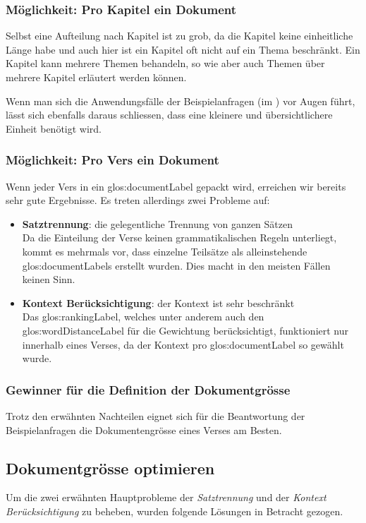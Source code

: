 \subsubsection{Möglichkeit: Pro Kapitel ein Dokument}
Selbst eine Aufteilung nach Kapitel ist zu grob, da die Kapitel keine einheitliche Länge habe und auch hier ist ein Kapitel oft nicht auf ein Thema beschränkt.
Ein Kapitel kann mehrere Themen behandeln, so wie aber auch Themen über mehrere Kapitel erläutert werden können.

Wenn man sich die Anwendungsfälle der Beispielanfragen (im ) vor Augen führt, lässt sich ebenfalls daraus schliessen, dass eine kleinere und übersichtlichere Einheit benötigt wird.

\subsubsection{Möglichkeit: Pro Vers ein Dokument}
Wenn jeder Vers in ein \gls{glos:documentLabel} gepackt wird, erreichen wir bereits sehr gute Ergebnisse.
Es treten allerdings zwei Probleme auf:
\begin{itemize}
	\item \textbf{Satztrennung}: die gelegentliche Trennung von ganzen Sätzen\\
	Da die Einteilung der Verse keinen grammatikalischen Regeln unterliegt, kommt es mehrmals vor, dass einzelne Teilsätze als alleinstehende \glspl{glos:documentLabel} erstellt wurden. Dies macht in den meisten Fällen keinen Sinn.
	\item \textbf{Kontext Berücksichtigung}: der Kontext ist sehr beschränkt\\
	Das \gls{glos:rankingLabel}, welches unter anderem auch den \gls{glos:wordDistanceLabel} für die Gewichtung berücksichtigt, funktioniert nur innerhalb eines Verses, da der Kontext pro \gls{glos:documentLabel} so gewählt wurde.
\end{itemize}

\subsubsection{Gewinner für die Definition der Dokumentgrösse}
Trotz den erwähnten Nachteilen eignet sich für die Beantwortung der Beispielanfragen die Dokumentengrösse eines Verses am Besten.


\subsection{Dokumentgrösse optimieren}
\label{sec:documentOptimazing}
Um die zwei erwähnten Hauptprobleme der \textit{Satztrennung} und der \textit{Kontext Berücksichtigung} zu beheben, wurden folgende Lösungen in Betracht gezogen.


